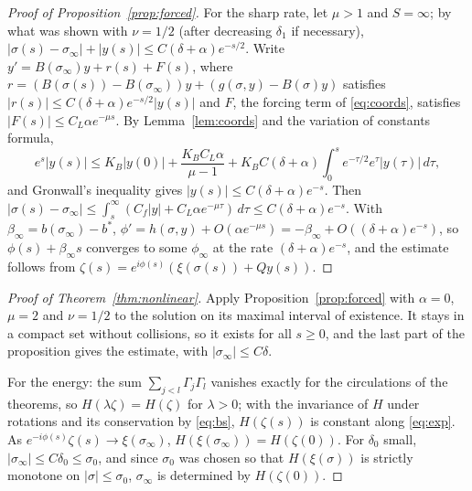 \documentclass[11pt]{article}
\theoremstyle{definition}
\begin{document}
\begin{proof}[Proof of Proposition~\ref{prop:forced}]
For the sharp rate, let $\mu > 1$ and $S = \infty$; by what was shown with $\nu = 1/2$ (after decreasing $\delta_1$ if necessary), $|\sigma(s) - \sigma_\infty| + |y(s)| \le C(\delta + \alpha)e^{-s/2}$. Write $y' = B(\sigma_\infty)y + r(s) + F(s)$, where $r = (B(\sigma(s)) - B(\sigma_\infty))y + (g(\sigma, y) - B(\sigma)y)$ satisfies $|r(s)| \le C(\delta + \alpha)e^{-s/2}|y(s)|$ and $F$, the forcing term of \eqref{eq:coords}, satisfies $|F(s)| \le C_L\alpha e^{-\mu s}$. By Lemma~\ref{lem:coords} and the variation of constants formula,
\[
  e^{s}|y(s)| \le K_B|y(0)| + \frac{K_BC_L\alpha}{\mu - 1} + K_BC(\delta + \alpha)\int_0^se^{-\tau/2}e^{\tau}|y(\tau)|\,d\tau,
\]
and Gronwall's inequality gives $|y(s)| \le C(\delta + \alpha)e^{-s}$. Then $|\sigma(s) - \sigma_\infty| \le \int_s^\infty(C_f|y| + C_L\alpha e^{-\mu\tau})\,d\tau \le C(\delta + \alpha)e^{-s}$. With $\beta_\infty = b(\sigma_\infty) - b^*$, $\phi' = h(\sigma, y) + O(\alpha e^{-\mu s}) = -\beta_\infty + O((\delta + \alpha)e^{-s})$, so $\phi(s) + \beta_\infty s$ converges to some $\phi_\infty$ at the rate $(\delta + \alpha)e^{-s}$, and the estimate follows from $\zeta(s) = e^{i\phi(s)}(\xi(\sigma(s)) + Qy(s))$.
\end{proof}

\begin{proof}[Proof of Theorem~\ref{thm:nonlinear}]
Apply Proposition~\ref{prop:forced} with $\alpha = 0$, $\mu = 2$ and $\nu = 1/2$ to the solution on its maximal interval of existence. It stays in a compact set without collisions, so it exists for all $s \ge 0$, and the last part of the proposition gives the estimate, with $|\sigma_\infty| \le C\delta$.

For the energy: the sum $\sum_{j<l}\Gamma_j\Gamma_l$ vanishes exactly for the circulations of the theorems, so $H(\lambda\zeta) = H(\zeta)$ for $\lambda > 0$; with the invariance of $H$ under rotations and its conservation by \eqref{eq:bs}, $H(\zeta(s))$ is constant along \eqref{eq:exp}. As $e^{-i\phi(s)}\zeta(s) \to \xi(\sigma_\infty)$, $H(\xi(\sigma_\infty)) = H(\zeta(0))$. For $\delta_0$ small, $|\sigma_\infty| \le C\delta_0 \le \sigma_0$, and since $\sigma_0$ was chosen so that $H(\xi(\sigma))$ is strictly monotone on $|\sigma| \le \sigma_0$, $\sigma_\infty$ is determined by $H(\zeta(0))$.
\end{proof}
\end{document}
